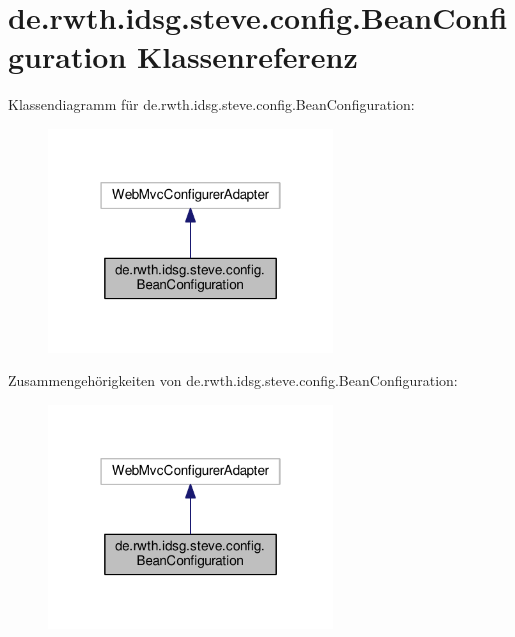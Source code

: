 \hypertarget{classde_1_1rwth_1_1idsg_1_1steve_1_1config_1_1_bean_configuration}{\section{de.\-rwth.\-idsg.\-steve.\-config.\-Bean\-Configuration Klassenreferenz}
\label{classde_1_1rwth_1_1idsg_1_1steve_1_1config_1_1_bean_configuration}
}


Klassendiagramm für de.\-rwth.\-idsg.\-steve.\-config.\-Bean\-Configuration\-:
\nopagebreak
\begin{figure}[H]
\begin{center}
\leavevmode
\includegraphics[width=214pt]{classde_1_1rwth_1_1idsg_1_1steve_1_1config_1_1_bean_configuration__inherit__graph}
\end{center}
\end{figure}


Zusammengehörigkeiten von de.\-rwth.\-idsg.\-steve.\-config.\-Bean\-Configuration\-:
\nopagebreak
\begin{figure}[H]
\begin{center}
\leavevmode
\includegraphics[width=214pt]{classde_1_1rwth_1_1idsg_1_1steve_1_1config_1_1_bean_configuration__coll__graph}
\end{center}
\end{figure}
